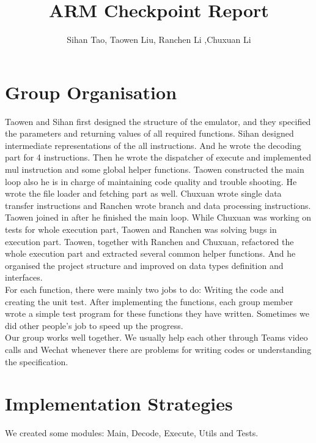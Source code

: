 \documentclass[11pt]{article}
\begin{document}
\title{ARM Checkpoint Report}
\author{Sihan Tao, Taowen Liu, Ranchen Li ,Chuxuan Li}

\maketitle

\section{Group Organisation}

Taowen and Sihan first designed the structure of the emulator, and they specified the parameters and returning values of all required functions. Sihan designed intermediate representations of the all instructions. And he wrote the decoding part for 4 instructions. Then he wrote the dispatcher of execute and implemented mul instruction and some global helper functions. Taowen constructed the main loop also he is in charge of maintaining code quality and trouble shooting. He wrote the file loader and fetching part as well. Chuxuan wrote single data transfer instructions and Ranchen wrote branch and data processing instructions. Taowen joined in after he finished the main loop. While Chuxuan was working on tests for whole execution part, Taowen and Ranchen was solving bugs in execution part. Taowen, together with Ranchen and Chuxuan, refactored the whole execution part and extracted several common helper functions. And he organised the project structure and improved on data types definition and interfaces.\\

For each function, there were mainly two jobs to do: Writing the code and creating the unit test. After implementing the functions, each group member wrote a simple test program for these functions they have written. Sometimes we did other people's job to speed up the progress.\\

Our group works well together. We usually help each other through Teams video calls and Wechat whenever there are problems for writing codes or understanding the specification.\\

\section{Implementation Strategies}

We created some modules: Main, Decode, Execute, Utils and Tests.\\
\end{document}
